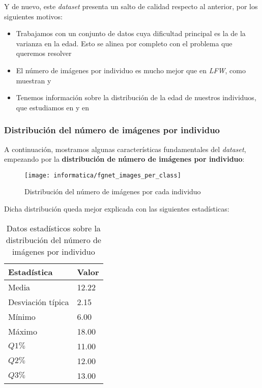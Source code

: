 Y de nuevo, este \textit{dataset} presenta un salto de calidad respecto al anterior, por los siguientes motivos:

\begin{itemize}
    \item Trabajamos con un conjunto de datos cuya dificultad principal es la de la varianza en la edad. Esto se alinea por completo con el problema que queremos resolver
    \item El número de imágenes por individuo es mucho mejor que en \textit{LFW}, como muestran  y 
    \item Tenemos información sobre la distribución de la edad de nuestros individuos, que estudiamos en  y en 
\end{itemize}

\subsubsection{Distribución del número de imágenes por individuo}

A continuación, mostramos algunas características fundamentales del \textit{dataset}, empezando por la \textbf{distribución de número de imágenes por individuo}:

\begin{figure}[H]
    \centering
    \texttt{[image: informatica/fgnet\_images\_per\_class]}
    \caption{Distribución del número de imágenes por cada individuo}
    \label{img:fgnet_images_per_class}
\end{figure}

Dicha distribución queda mejor explicada con las siguientes estadísticas:

\begin{table}[H]
\centering
\begin{tabular}{|l|l|}
    \hline
    \textbf{Estadística} & \textbf{Valor} \\
    \hline

    Media             & 12.22 \\
    Desviación típica & 2.15  \\
    Mínimo            & 6.00 \\
    Máximo            & 18.00 \\
    $Q1 \%$           & 11.00 \\
    $Q2 \%$           & 12.00 \\
    $Q3 \%$           & 13.00 \\

    \hline

\end{tabular}
\caption{Datos estadísticos sobre la distribución del número de imágenes por individuo}
\label{table:fgnet_images_per_class}
\end{table}

